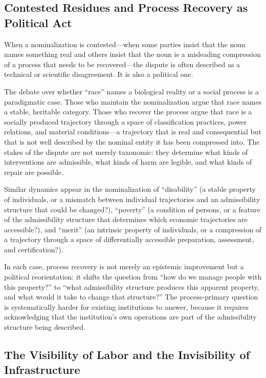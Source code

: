 \documentclass[12pt, a4paper]{article}
\theoremstyle{plain}
\theoremstyle{definition}
\theoremstyle{remark}
\begin{document}
\subsection{Contested Residues and Process Recovery as Political Act}

When a nominalization is contested---when some parties insist that the noun
names something real and others insist that the noun is a misleading compression
of a process that needs to be recovered---the dispute is often described as
a technical or scientific disagreement. It is also a political one.

The debate over whether ``race'' names a biological reality or a social
process is a paradigmatic case. Those who maintain the nominalization argue
that race names a stable, heritable category. Those who recover the process
argue that race is a socially produced trajectory through a space of
classification practices, power relations, and material conditions---a
trajectory that is real and consequential but that is not well described by
the nominal entity it has been compressed into. The stakes of the dispute
are not merely taxonomic: they determine what kinds of interventions are
admissible, what kinds of harm are legible, and what kinds of repair are
possible.

Similar dynamics appear in the nominalization of ``disability'' (a stable
property of individuals, or a mismatch between individual trajectories and
an admissibility structure that could be changed?), ``poverty'' (a condition
of persons, or a feature of the admissibility structure that determines
which economic trajectories are accessible?), and ``merit'' (an intrinsic
property of individuals, or a compression of a trajectory through a space
of differentially accessible preparation, assessment, and certification?).

In each case, process recovery is not merely an epistemic improvement but
a political reorientation: it shifts the question from ``how do we manage
people with this property?'' to ``what admissibility structure produces this
apparent property, and what would it take to change that structure?'' The
process-primary question is systematically harder for existing institutions
to answer, because it requires acknowledging that the institution's own
operations are part of the admissibility structure being described.

\subsection{The Visibility of Labor and the Invisibility of Infrastructure}
\end{document}
